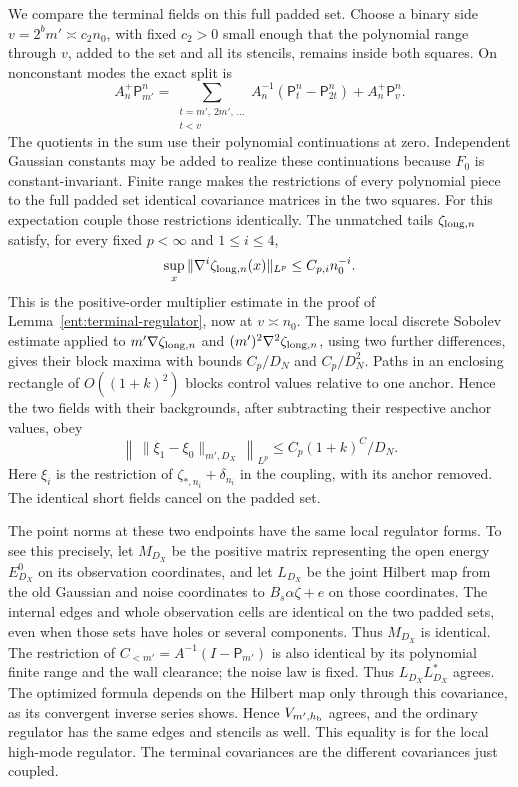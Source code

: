 We compare the terminal fields on this full padded set.  Choose a
binary side \(v=2^b m'\asymp c_2n_0\), with fixed \(c_2>0\) small
enough that the polynomial range through \(v\), added to the set
and all its stencils, remains inside both squares.  On nonconstant
modes the exact split is
\[
 A_n^+\mathsf P_{m'}^n
 =\sum_{\substack{t=m',\,2m',\,\ldots\\t<v}}
       A_n^{-1}(\mathsf P_t^n-\mathsf P_{2t}^n)
       +A_n^+\mathsf P_v^n.
\]
The quotients in the sum use their polynomial continuations at
zero.  Independent Gaussian constants may be added to realize
these continuations because \(F_0\) is constant-invariant.
Finite range makes the restrictions of every polynomial piece to
the full padded set identical covariance matrices in the two
squares.  For this expectation couple those restrictions identically.
The unmatched tails \(\zeta_{{\rm long},n}\) satisfy, for every
fixed \(p<\infty\) and \(1\le i\le4\),
\[
 \sup_x\|\nabla^i\zeta_{{\rm long},n}(x)\|_{L^p}
                                      \le C_{p,i}n_0^{-i}.
\]
This is the positive-order multiplier estimate in the proof of
Lemma~\ref{ent:terminal-regulator}, now at \(v\asymp n_0\).
The same local discrete Sobolev estimate applied to
\(m'\nabla\zeta_{{\rm long},n}\) and
\((m')^2\nabla^2\zeta_{{\rm long},n}\), using two further differences,
gives their block maxima with bounds \(C_p/D_N\) and \(C_p/D_N^2\).
Paths in an enclosing rectangle of \(O((1+k)^2)\) blocks control
values relative to one anchor.  Hence the two fields with their
backgrounds, after subtracting their respective anchor values, obey
\begin{equation}\label{obs:coupling-direction}
 \left\|\,\|\xi_1-\xi_0\|_{m',D_X}\,\right\|_{L^p}
                      \le C_p(1+k)^C/D_N.
\end{equation}
Here \(\xi_i\) is the restriction of
\(\zeta_{*,n_i}+\delta_{n_i}\) in the coupling, with its anchor
removed.  The identical short fields cancel on the padded set.

The point norms at these two endpoints have the same local regulator
forms.  To see this precisely, let \(M_{D_X}\) be the positive matrix
representing the open energy \(E_{D_X}^0\) on its observation
coordinates, and let \(L_{D_X}\) be the joint Hilbert map from the
old Gaussian and noise coordinates to
\(B_s\alpha\zeta+e\) on those coordinates.  The internal edges and
whole observation cells are identical on the two padded sets, even
when those sets have holes or several components.  Thus
\(M_{D_X}\) is identical.  The restriction of
\(C_{<m'}=A^{-1}(I-\mathsf P_{m'})\) is also identical by its
polynomial finite range and the wall clearance; the noise law is
fixed.  Thus \(L_{D_X}L_{D_X}^*\) agrees.  The optimized formula
\cite[Equation~(9.16)]{B} depends on the Hilbert map only through
this covariance, as its convergent inverse series shows.  Hence
\(V_{m',h_{\rm b}}\) agrees, and the ordinary regulator has the
same edges and stencils as well.  This equality is for the local
high-mode regulator.  The terminal covariances are the different
covariances just coupled.

